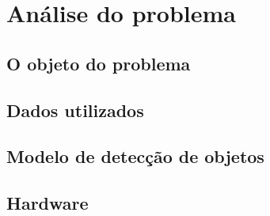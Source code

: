 \chapter{Análise do problema}

\section{O objeto do problema}

\section{Dados utilizados}

\section{Modelo de detecção de objetos}

\section{Hardware}